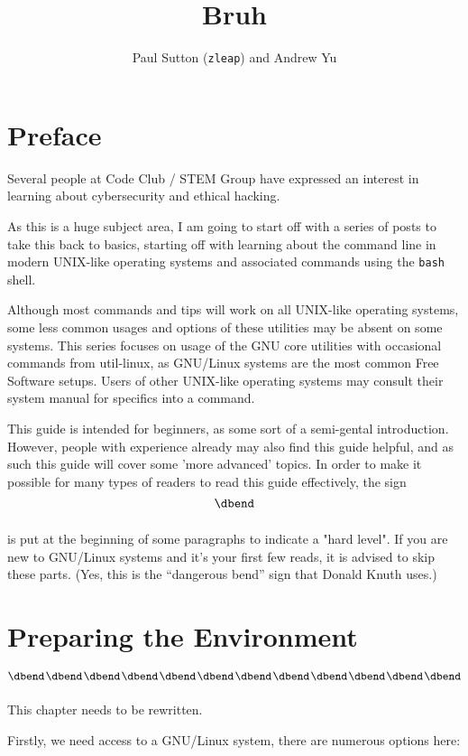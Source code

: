 \documentclass{extbook}
\title{Bruh}
\author{Paul Sutton (\texttt{zleap}) and Andrew Yu}
\begin{document}
\maketitle

\frontmatter
\chapter{Preface}

Several people at Code Club / STEM Group have expressed an interest in learning about cybersecurity and ethical hacking.

As this is a huge subject area, I am going to start off with a series of posts to take this back to basics, starting off with learning about the command line in modern UNIX-like operating systems and associated commands using the \texttt{bash} shell.

Although most commands and tips will work on all UNIX-like operating systems, some less common usages and options of these utilities may be absent on some systems.  This series focuses on usage of the GNU core utilities with occasional commands from util-linux, as GNU/Linux systems are the most common Free Software setups.  Users of other UNIX-like operating systems may consult their system manual for specifics into a command.

This guide is intended for beginners, as some sort of a semi-gental introduction.  However, people with experience already may also find this guide helpful, and as such this guide will cover some 'more advanced' topics.  In order to make it possible for many types of readers to read this guide effectively, the  sign
$$\vbox{\hbox{\dbend}\vskip 11pt}$$
is put at the beginning of some paragraphs to indicate a "hard level".  If you are new to GNU/Linux systems and it's your first few reads, it is advised to skip these parts.  (Yes, this is the ``{dangerous bend}'' sign that Donald Knuth uses.)

\tableofcontents

\mainmatter
\chapter{Preparing the Environment}

$$\vcenter{\hbox{\dbend\kern1pt\dbend\kern1pt\dbend\kern1pt\dbend\kern1pt\dbend\kern1pt\dbend\kern1pt\dbend\kern1pt\dbend\kern1pt\dbend\kern1pt\dbend\kern1pt\dbend\kern1pt\dbend}\vskip 11pt}$$
This chapter needs to be rewritten.

Firstly, we need access to a GNU/Linux system, there are numerous options here:
\end{document}
